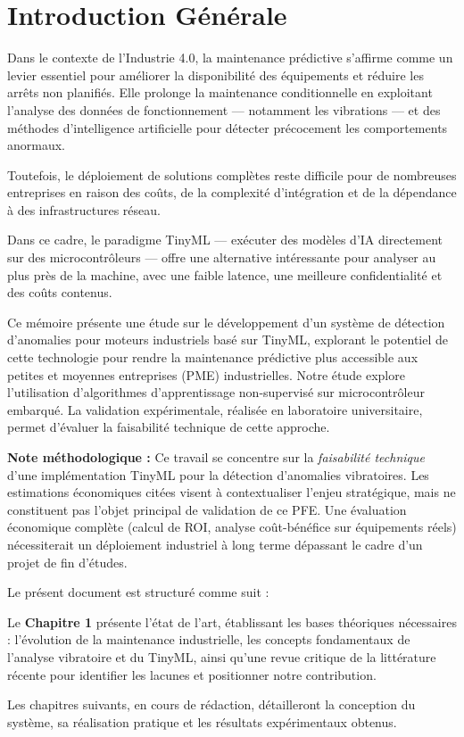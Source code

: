 \chapter*{Introduction Générale}
\thispagestyle{plain}  %

Dans le contexte de l'Industrie 4.0, la maintenance prédictive s'affirme comme un levier essentiel pour améliorer la disponibilité des équipements et réduire les arrêts non planifiés. Elle prolonge la maintenance conditionnelle en exploitant l'analyse des données de fonctionnement — notamment les vibrations — et des méthodes d'intelligence artificielle pour détecter précocement les comportements anormaux.

Toutefois, le déploiement de solutions complètes reste difficile pour de nombreuses entreprises en raison des coûts, de la complexité d'intégration et de la dépendance à des infrastructures réseau.

Dans ce cadre, le paradigme TinyML — exécuter des modèles d'IA directement sur des microcontrôleurs — offre une alternative intéressante pour analyser au plus près de la machine, avec une faible latence, une meilleure confidentialité et des coûts contenus.

Ce mémoire présente une étude sur le développement d'un système de détection d'anomalies pour moteurs industriels basé sur TinyML, explorant le potentiel de cette technologie pour rendre la maintenance prédictive plus accessible aux petites et moyennes entreprises (PME) industrielles. Notre étude explore l'utilisation d'algorithmes d'apprentissage non-supervisé sur microcontrôleur embarqué. La validation expérimentale, réalisée en laboratoire universitaire, permet d'évaluer la faisabilité technique de cette approche.

\textbf{Note méthodologique :} Ce travail se concentre sur la \textit{faisabilité technique} d'une implémentation TinyML pour la détection d'anomalies vibratoires. Les estimations économiques citées visent à contextualiser l'enjeu stratégique, mais ne constituent pas l'objet principal de validation de ce PFE. Une évaluation économique complète (calcul de ROI, analyse coût-bénéfice sur équipements réels) nécessiterait un déploiement industriel à long terme dépassant le cadre d'un projet de fin d'études.

Le présent document est structuré comme suit :

Le \textbf{Chapitre 1} présente l'état de l'art, établissant les bases théoriques nécessaires : l'évolution de la maintenance industrielle, les concepts fondamentaux de l'analyse vibratoire et du TinyML, ainsi qu'une revue critique de la littérature récente pour identifier les lacunes et positionner notre contribution.

Les chapitres suivants, en cours de rédaction, détailleront la conception du système, sa réalisation pratique et les résultats expérimentaux obtenus.
